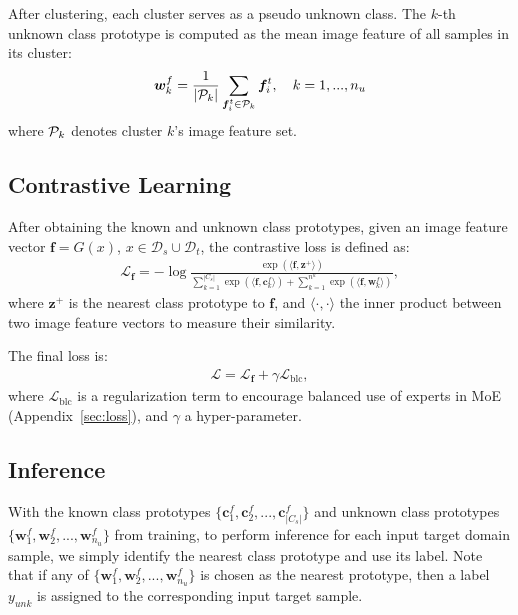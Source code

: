 \documentclass[10pt,twocolumn,letterpaper]{article}
\begin{document}
After clustering, each cluster serves as a pseudo unknown class. The $k$-th unknown class prototype is computed as the mean image feature of all samples in its cluster:
\begin{align}
    \bm{w}_{k}^{f} = \frac{1}{|{\cal P}_{k}|}\sum_{\bm{f}^t_i \in {\cal P}_{k}} \bm{f}^t_i,\quad k=1,...,n_u
\end{align}
where ${\cal P}_{k}$ denotes cluster $k$'s image feature set. 

\subsection{Contrastive Learning} \label{sec:learning}

After obtaining the known and unknown class prototypes, given an image feature vector $\bm{f}=G(x)$, $x \in \mathcal{D}_s\cup\mathcal{D}_t$, the contrastive loss is defined as:
\begin{align}
    \mathcal{L}_{\bm {f}} = - \log \frac{\exp{(\langle \bm{f}, \bm{z^{+}} \rangle  )}}{\sum_{k=1}^{|C_s|} \exp{(\langle \bm{f}, \bm{c}^f_k \rangle  )} + \sum_{k=1}^{n^u} \exp{(\langle \bm{f}, \bm{w}_{k}^f \rangle )}},
    \label{eq:joint}
\end{align}
where $\bm{z^{+}}$ is the nearest class prototype to $\bm{f}$, and $\langle\cdot,\cdot\rangle$ the inner product between two image feature vectors to measure their similarity.

The final loss is:
\begin{align}
    \mathcal{L} = \mathcal{L}_{\bm {f}} + \gamma \mathcal{L}_{\text {blc}}, \label{eq:gamma}
\end{align}
where $ \mathcal{L}_{\text {blc}}$ is a regularization term to encourage balanced use of experts in MoE \cite{shazeer2017outrageously, li2023sparse} (Appendix~\ref{sec:loss}), and $\gamma$ a hyper-parameter.

\subsection{Inference}

With the known class prototypes $\{\bm{c}^f_1, \bm{c}^f_2,...,\bm{c}^f_{|C_s|}\}$ and unknown class prototypes $\{\bm{w}_{1}^{f},\bm{w}_{2}^{f},...,\bm{w}_{n_u}^{f}\}$ from training, to perform inference for each input target domain sample, we simply identify the nearest class prototype and use its label. Note that if any of $\{\bm{w}_{1}^{f},\bm{w}_{2}^{f},...,\bm{w}_{n_u}^{f}\}$ is chosen as the nearest prototype, then a label $y_{unk}$ is assigned to the corresponding input target sample.
\end{document}
